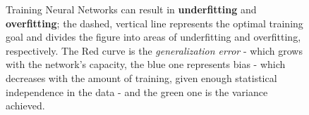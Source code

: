     \begin{figure}
        \centering
        \caption{Training Neural Networks can result in \textbf{underfitting} and \textbf{overfitting}; the dashed, vertical line represents the optimal training goal and divides the figure into areas of underfitting and overfitting, respectively. The Red curve is the \textit{generalization error} - which grows with the network's capacity, the blue one represents bias - which decreases with the amount of training, given enough statistical independence in the data - and the green one is the variance achieved.}
        \label{fig:over_underfitting}
    \end{figure}